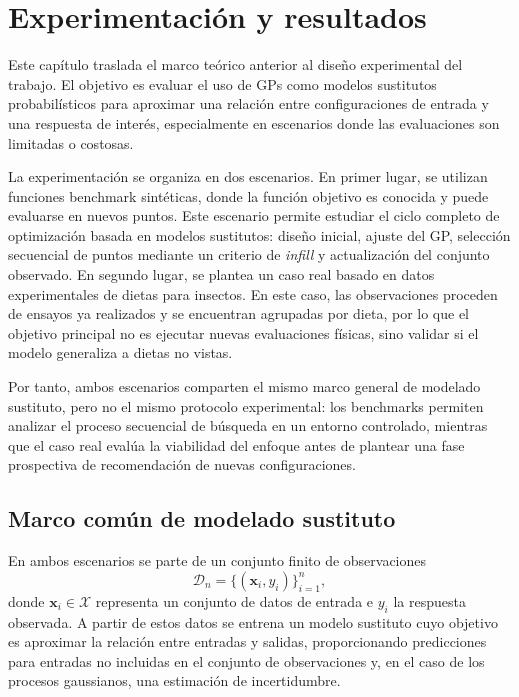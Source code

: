 \chapter{Experimentación y resultados}
\label{chap:diseno_experimental}

Este capítulo traslada el marco teórico anterior al diseño experimental del trabajo. El objetivo es evaluar el uso de GPs como modelos sustitutos probabilísticos para aproximar una relación entre configuraciones de entrada y una respuesta de interés, especialmente en escenarios donde las evaluaciones son limitadas o costosas.

La experimentación se organiza en dos escenarios. En primer lugar, se utilizan funciones benchmark sintéticas, donde la función objetivo es conocida y puede evaluarse en nuevos puntos. Este escenario permite estudiar el ciclo completo de optimización basada en modelos sustitutos: diseño inicial, ajuste del GP, selección secuencial de puntos mediante un criterio de \emph{infill} y actualización del conjunto observado. En segundo lugar, se plantea un caso real basado en datos experimentales de dietas para insectos. En este caso, las observaciones proceden de ensayos ya realizados y se encuentran agrupadas por dieta, por lo que el objetivo principal no es ejecutar nuevas evaluaciones físicas, sino validar si el modelo generaliza a dietas no vistas.

Por tanto, ambos escenarios comparten el mismo marco general de modelado sustituto, pero no el mismo protocolo experimental: los benchmarks permiten analizar el proceso secuencial de búsqueda en un entorno controlado, mientras que el caso real evalúa la viabilidad del enfoque antes de plantear una fase prospectiva de recomendación de nuevas configuraciones.

\section{Marco común de modelado sustituto}
\label{subsec:marco_comun_modelado_sustituto}

En ambos escenarios se parte de un conjunto finito de observaciones
\[
    \mathcal{D}_n = \{(\bm{x}_i, y_i)\}_{i=1}^{n},
\]
donde \(\bm{x}_i \in \mathcal{X}\) representa un conjunto de datos de entrada e \(y_i\) la respuesta observada. A partir de estos datos se entrena un modelo sustituto cuyo objetivo es aproximar la relación entre entradas y salidas, proporcionando predicciones para entradas no incluidas en el conjunto de observaciones y, en el caso de los procesos gaussianos, una estimación de incertidumbre.

